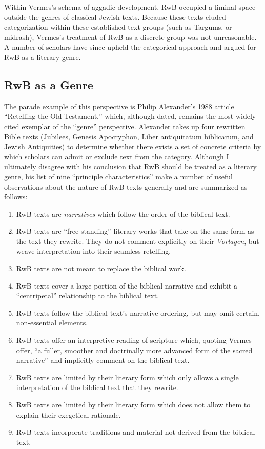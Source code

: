 Within Vermes's schema of aggadic development, RwB occupied a liminal
space outside the genres of classical Jewish texts. Because these texts
eluded categorization within these established text groups (such as
Targums, or midrash), Vermes's treatment of RwB as a discrete group was
not unreasonable. A number of scholars have since upheld the categorical
approach and argued for RwB as a literary genre.

\subsection{RwB as a Genre}\label{rwb-as-a-genre}

The parade example of this perspective is Philip Alexander's 1988
article ``Retelling the Old Testament,'' which, although dated, remains
the most widely cited exemplar of the ``genre''
perspective.\autocites{alexander_carson-williamson1988}[Vermes himself
even put his stamp of approval on it, see][4]{vermes_zsengeller2014}
Alexander takes up four rewritten Bible texts (Jubilees,
Genesis Apocryphon, Liber antiquitatum biblicarum, and
Jewish Antiquities) to determine whether there exists a set of concrete
criteria by which scholars can admit or exclude text from the category.
Although I ultimately disagree with his conclusion that RwB should be
treated as a literary genre, his list of nine ``principle
characteristics'' make a number of useful observations about the nature
of RwB texts generally and are summarized as follows:

\begin{enumerate}
\def\labelenumi{\arabic{enumi}.}
\tightlist
\item
  RwB texts are \emph{narratives} which follow the order of the biblical
  text.
\item
  RwB texts are ``free standing'' literary works that take on the same
  form as the text they rewrite. They do not comment explicitly on their
  \emph{Vorlagen}, but weave interpretation into their seamless
  retelling.
\item
  RwB texts are not meant to replace the biblical work.
\item
  RwB texts cover a large portion of the biblical narrative and exhibit
  a ``centripetal'' relationship to the biblical text.
\item
  RwB texts follow the biblical text's narrative ordering, but may omit
  certain, non-essential elements.
\item
  RwB texts offer an interpretive reading of scripture which, quoting
  Vermes offer, ``a fuller, smoother and doctrinally more advanced form
  of the sacred narrative''\autocite[Citing Vermes in][305]{schurer1986}
  and implicitly comment on the biblical text.
\item
  RwB texts are limited by their literary form which only allows a
  single interpretation of the biblical text that they rewrite.
\item
  RwB texts are limited by their literary form which does not allow them
  to explain their exegetical rationale.
\item
  RwB texts incorporate traditions and material not derived from the
  biblical text.
\end{enumerate}

